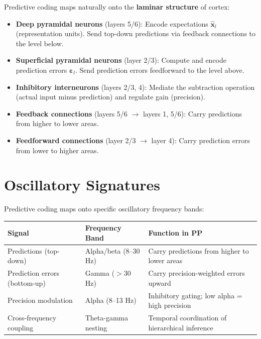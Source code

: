 \documentclass[11pt,a4paper]{report}
\begin{document}
Predictive coding maps naturally onto the \textbf{laminar structure} of cortex:

\begin{mechbox}
\begin{itemize}[leftmargin=1.5em]
  \item \textbf{Deep pyramidal neurons} (layers 5/6): Encode expectations $\hat{\mathbf{x}}_l$ (representation units). Send top-down predictions via feedback connections to the level below.
  \item \textbf{Superficial pyramidal neurons} (layer 2/3): Compute and encode prediction errors $\boldsymbol{\varepsilon}_l$. Send prediction errors feedforward to the level above.
  \item \textbf{Inhibitory interneurons} (layers 2/3, 4): Mediate the subtraction operation (actual input minus prediction) and regulate gain (precision).
  \item \textbf{Feedback connections} (layers 5/6 $\to$ layers 1, 5/6): Carry predictions from higher to lower areas.
  \item \textbf{Feedforward connections} (layer 2/3 $\to$ layer 4): Carry prediction errors from lower to higher areas.
\end{itemize}
\end{mechbox}

\section{Oscillatory Signatures}

Predictive coding maps onto specific oscillatory frequency bands:

\begin{center}
\renewcommand{\arraystretch}{1.3}
\begin{tabular}{>{\raggedright}p{3.5cm} >{\raggedright}p{3cm} >{\raggedright\arraybackslash}p{6cm}}
  \toprule
  \textbf{Signal} & \textbf{Frequency Band} & \textbf{Function in PP} \\
  \midrule
  Predictions (top-down) & Alpha/beta (8--30 Hz) & Carry predictions from higher to lower areas \\
  Prediction errors (bottom-up) & Gamma ($>$30 Hz) & Carry precision-weighted errors upward \\
  Precision modulation & Alpha (8--13 Hz) & Inhibitory gating; low alpha = high precision \\
  Cross-frequency coupling & Theta-gamma nesting & Temporal coordination of hierarchical inference \\
  \bottomrule
\end{tabular}
\end{center}
\end{document}
